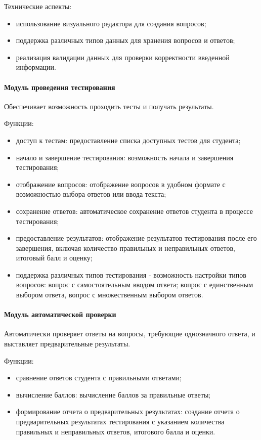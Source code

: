 Технические аспекты: 
\begin{itemize}
	\item использование визуального редактора для создания вопросов;
	\item поддержка различных типов данных для хранения вопросов и ответов;
	\item реализация валидации данных для проверки корректности введенной информации.
\end{itemize}

	
\paragraph{Модуль проведения тестирования}
	
Обеспечивает возможность проходить тесты и получать результаты.

Функции: 
\begin{itemize}
	\item доступ к тестам: предоставление списка доступных тестов для студента;
	\item начало и завершение тестирования: возможность начала и завершения тестирования;
	\item отображение вопросов: отображение вопросов в удобном формате с возможностью выбора ответов или ввода текста;
	\item сохранение ответов: автоматическое сохранение ответов студента в процессе тестирования;
	\item предоставление результатов: отображение результатов тестирования после его завершения, включая количество правильных и неправильных ответов, итоговый балл и оценку;
	\item поддержка различных типов тестирования - возможность настройки типов вопросов: вопрос с самостоятельным вводом ответа; вопрос с единственным выбором ответа, вопрос с множественным выбором ответов.
\end{itemize}

\paragraph{Модуль автоматической проверки}

Автоматически проверяет ответы на вопросы, требующие однозначного ответа, и выставляет предварительные результаты.

Функции: 
\begin{itemize}
	\item сравнение ответов студента с правильными ответами;
	\item вычисление баллов: вычисление баллов за правильные ответы;
	\item формирование отчета о предварительных результатах: создание отчета о предварительных результатах тестирования с указанием количества правильных и неправильных ответов, итогового балла и оценки.
\end{itemize}	

